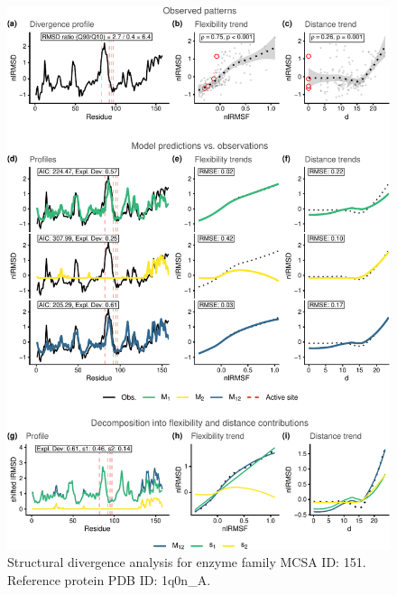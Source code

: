 \documentclass[
]{article}
\begin{document}
\clearpage
\begin{figure}[H]
\centering


\begin{center}\includegraphics{supplementary_material_files/figure-latex/generate_figures-7} \end{center}

\caption{Structural divergence analysis for enzyme family MCSA ID: 151. Reference protein PDB ID: 1q0n\_A.}
\end{figure}
\end{document}
